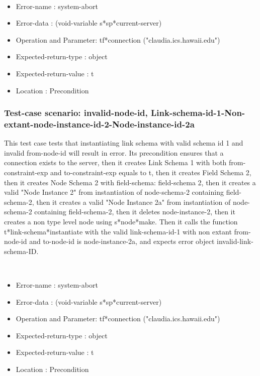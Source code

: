 \
\begin {itemize}
\item 	Error-name             : system-abort
\item Error-data             : (void-variable s*sp*current-server)
\item Operation and Parameter: tf*connection ("claudia.ics.hawaii.edu")
\item Expected-return-type   : object
\item Expected-return-value  : t
\item Location               : Precondition



\end {itemize}
\subsubsection {Test-case scenario: invalid-node-id, Link-schema-id-1-Non-extant-node-instance-id-2-Node-instance-id-2a}


This test case tests that instantiating link schema with valid schema id 1 and invalid from-node-id will result in error.
Its precondition ensures that a connection exists to the server, then it creates Link Schema 1 with both from-constraint-exp and to-constraint-exp equals to t, then it creates Field Schema 2, then it creates Node Schema 2 with field-schema: field-schema 2, then it creates a valid "Node Instance 2" from instantiation of node-schema-2 containing field-schema-2, then it creates a valid "Node Instance 2a" from instantiation of node-schema-2 containing field-schema-2, then it deletes node-instance-2, then it creates a non type level node using s*node*make.
Then it calls the function t*link-schema*instantiate  with the valid link-schema-id-1 with non extant from-node-id and to-node-id is node-instance-2a, and expects error object invalid-link-schema-ID.



\
\begin {itemize}
\item 	Error-name             : system-abort
\item Error-data             : (void-variable s*sp*current-server)
\item Operation and Parameter: tf*connection ("claudia.ics.hawaii.edu")
\item Expected-return-type   : object
\item Expected-return-value  : t
\item Location               : Precondition



\end {itemize}
